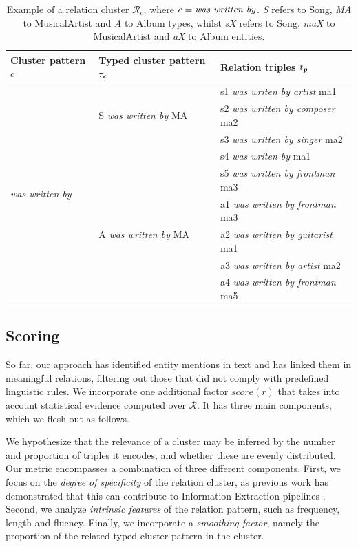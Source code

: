 \begin{table}[ht!]
\scriptsize
	\begin{tabular}{ | l | l | l | }
	\hline
\textbf{Cluster pattern $c$} & \textbf{Typed cluster pattern $ \tau_\textbf{\textit{c}}$} & \textbf{Relation triples $t_\textbf{\textit{p}}$} \\
\hline
\multirow{10}{*}{\textit{was written by}} & \multirow{3}{*}{S \textit{was written by} MA} & s1 \textit{was writen by artist} ma1 \\
\cline{3-3}
 &  & s2 \textit{was written by composer} ma2 \\
\cline{3-3}
 &  & s3 \textit{was written by singer} ma2 \\
\cline{3-3}
&  & s4 \textit{was writen by} ma1 \\
 \cline{3-3}
&  & s5 \textit{was written by frontman} ma3 \\
\cline{2-3}
& \multirow{3}{*}{A \textit{was written by} MA} & a1 \textit{was written by frontman} ma3 \\
 \cline{3-3}
&  & a2 \textit{was written by guitarist} ma1 \\
\cline{3-3}
&  & a3 \textit{was written by artist} ma2 \\
\cline{3-3}
&  & a4 \textit{was written by frontman} ma5 \\
    \hline
	\end{tabular}
	\caption{Example of a relation cluster $\mathcal{R}_c$, where $c = \mbox{\textit{was written by}}$. \textit{S} refers to Song, \textit{MA} to MusicalArtist and \textit{A} to Album types, whilst \textit{sX} refers to Song, \textit{maX} to MusicalArtist and \textit{aX} to Album entities.}
	\label{tbl:kb:example_grouping}
\end{table}


\subsection{Scoring}
\label{sec:kb:method:scoring}

So far, our approach has identified entity mentions in text and has linked them in meaningful relations, filtering out those that did not comply with predefined linguistic rules. We incorporate one additional factor $score(r)$ that takes into account statistical evidence computed over $\mathcal{R}$. It has three main components, which we flesh out as follows.

We hypothesize that the relevance of a cluster may be inferred by the number and proportion of triples it encodes, and whether these are evenly distributed. 
Our metric encompasses a combination of three different components. First, we focus on the \textit{degree of specificity} of the relation cluster, as previous work has demonstrated that this can contribute to Information Extraction pipelines \cite{DelliBovietal2015}. Second, we analyze \textit{intrinsic features} of the relation pattern, such as frequency, length and fluency. Finally, we incorporate a \textit{smoothing factor}, namely the proportion of the related typed cluster pattern in the cluster.


